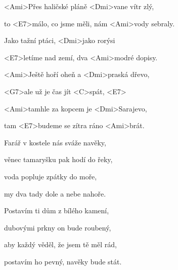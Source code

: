 

\zs
<Ami>Přes haličské pláně <Dmi>vane vítr zlý,

to <E7>málo, co jsme měli, nám <Ami>vody sebraly.

Jako tažní ptáci, <Dmi>jako rorýsi

<E7>letíme nad zemí, dva <Ami>modré dopisy.
\ks


\zr
<Ami>Ještě hoří oheň a <Dmi>praská dřevo,

<G7>ale už je čas jít <C>spát, <E7>

<Ami>tamhle za kopcem je <Dmi>Sarajevo,

tam <E7>budeme se zítra ráno <Ami>brát.
\kr

\zs
Farář v kostele nás sváže navěky,

věnec tamaryšku pak hodí do řeky,

voda popluje zpátky do moře,

my dva tady dole a nebe nahoře.
\ks

\zr \kr

\zs
Postavím ti dům z bílého kamení,

dubovými prkny on bude roubený,

aby každý věděl, že jsem tě měl rád,

postavím ho pevný, navěky bude stát.
\ks


\zr \kr

\kp
